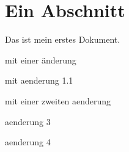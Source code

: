 \documentclass{scrartcl}
\begin{document}
\section{Ein Abschnitt}
Das ist mein erstes Dokument.

mit einer änderung

mit aenderung 1.1

mit einer zweiten aenderung

aenderung 3

aenderung 4
\end{document}
